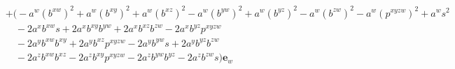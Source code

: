 \documentclass{l4proj}
\begin{document}
\begin{appendices}
\begin{equation}
\begin{aligned}
  & + \Big( - a^{w} {\left ( b^{xw} \right )}^{2} + a^{w} {\left ( b^{xy} \right )}^{2} + a^{w} {\left ( b^{xz} \right )}^{2} - a^{w} {\left ( b^{yw} \right )}^{2} + a^{w} {\left ( b^{yz} \right )}^{2} - a^{w} {\left ( b^{zw} \right )}^{2} - a^{w} {\left ( p^{xyzw} \right )}^{2} + a^{w} s^{2} \\
  & \quad - 2 a^{x} b^{xw} s + 2 a^{x} b^{xy} b^{yw} + 2 a^{x} b^{xz} b^{zw} - 2 a^{x} b^{yz} p^{xyzw} \\
  & \quad - 2 a^{y} b^{xw} b^{xy} + 2 a^{y} b^{xz} p^{xyzw} - 2 a^{y} b^{yw} s + 2 a^{y} b^{yz} b^{zw} \\
  & \quad - 2 a^{z} b^{xw} b^{xz} - 2 a^{z} b^{xy} p^{xyzw} - 2 a^{z} b^{yw} b^{yz} - 2 a^{z} b^{zw} s \Big) \boldsymbol{e}_{w}  
  \end{aligned}
\end{equation}


\end{appendices}
\end{document}
